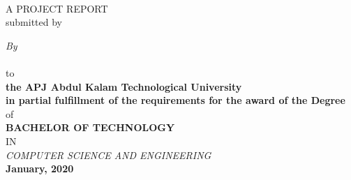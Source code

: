 \begin{titlepage}
\begin{center}
{\Large\sf \textbf{\textcolor[rgb]{0,0,0}{\projectName}}}\\[5ex]
\vspace{0.3 cm}
A PROJECT REPORT\\
submitted by

{\small \textcolor[rgb]{0,0,0}{\emph{By}} \\[1ex]

{\sf \sf {\textcolor[rgb]{0,0,0}{
			\firstAuthor (\firstAuthorRegNo) \\ 
			\secondAuthor (\secondAuthorRegNo) \\
			\thirdAuthor (\thirdAuthorRegNo) \\
			\fourthAuthor (\fourthAuthorRegNo)}}} \\%
		  
\vspace{0.5 cm}
to
\\
\vspace{0.5 cm}
\textbf{the APJ Abdul Kalam Technological University \\
	in partial fulfillment of the requirements for the award of the Degree }\\
\vspace{0.8 cm}
of
\\
 

\textbf{BACHELOR OF TECHNOLOGY}}
\\
IN 
\\
\textit{COMPUTER SCIENCE AND ENGINEERING}
\\
    \textbf{ January, 2020}
\vspace{0.2 cm} \\[2ex]


\end{center}
\end{titlepage}
